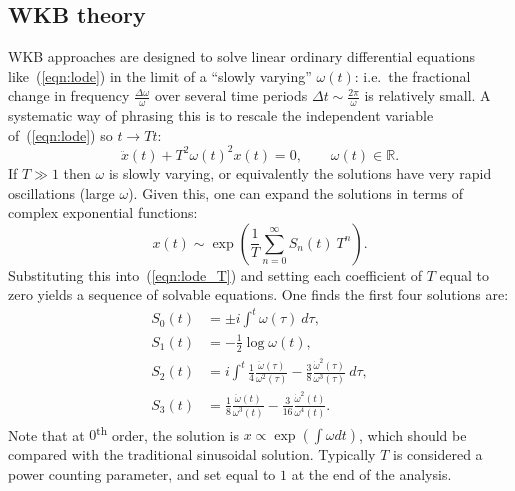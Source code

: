 \subsection{WKB theory}
\label{sec:wkb}
WKB approaches are designed to solve linear ordinary differential equations like~(\ref{eqn:lode}) in the limit of a ``slowly varying'' $\omega(t)$: i.e.\ the fractional change in frequency $\frac{\Delta\omega}{\omega}$ over several time periods $\Delta t \sim \frac{2\pi}{\omega}$ is relatively small.
A systematic way of phrasing this is to rescale the independent variable of~(\ref{eqn:lode}) so $t\rightarrow T t$:
\begin{equation}
  \ddot{x}(t) + T^2{\omega(t)}^2x(t) = 0,\qquad \omega(t)\in\mathbb{R}.
  \label{eqn:lode_T}
\end{equation}
If $T\gg1$ then $\omega$ is slowly varying, or equivalently the solutions have very rapid oscillations (large $\omega$). Given this, one can expand the solutions in terms of complex exponential functions:
\begin{equation}
  x(t)\sim \exp\left( \frac{1}{T}\sum\limits_{n=0}^{\infty} S_n(t)\: T^n \right).
  \label{eqn:asymp}
\end{equation}
Substituting this into~(\ref{eqn:lode_T}) and setting each coefficient of $T$ equal to zero yields a sequence of solvable equations. One finds the first four solutions are:
\begin{align}
  S_0(t) &= \pm i \int^t \omega(\tau)\: d\tau,
  \label{eqn:S0}\\
  S_1(t) &= -\frac{1}{2}\log \omega(t),\\
  S_2(t) &=  i \int^t \frac{1}{4}\frac{\ddot{\omega}(\tau)}{\omega^{2}(\tau)} - \frac{3}{8}\frac{\dot{\omega}^2(\tau)}{\omega^{3}(\tau)}\: d\tau, \\
  S_3(t) &=  \frac{1}{8}\frac{\ddot{\omega}(t)}{\omega^{3}(t)} - \frac{3}{16} \frac{\dot{\omega}^{2}(t)}{\omega^{4}(t)}.
\end{align}
Note that at $0$\textsuperscript{th} order, the solution is $x\propto\exp\left( \int \omega dt \right)$, which should be compared with the traditional sinusoidal solution.
Typically $T$ is considered a power counting parameter, and set equal to $1$ at the end of the analysis.

